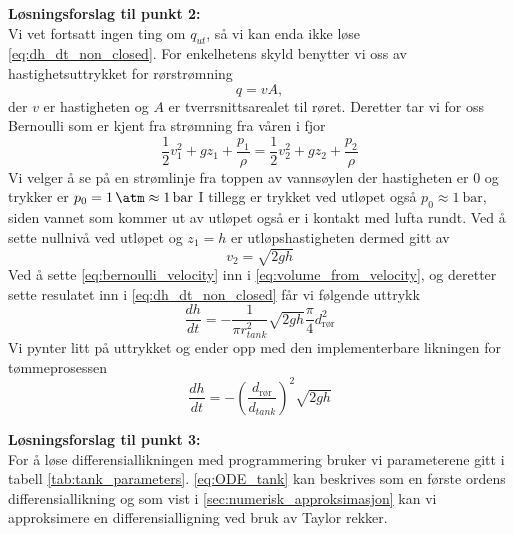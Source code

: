 \textbf{Løsningsforslag til punkt 2:} \\
Vi vet fortsatt ingen ting om $q_{ut}$, så vi kan enda ikke løse \eqref{eq:dh_dt_non_closed}. For enkelhetens skyld benytter vi oss av hastighetsuttrykket for rørstrømning
\begin{equation}
    q = vA,
    \label{eq:volume_from_velocity}
\end{equation}
der $v$ er hastigheten og $A$ er tverrsnittsarealet til røret. Deretter tar vi for oss Bernoulli som er kjent fra strømning fra våren i fjor
\begin{equation}
    \frac{1}{2}v_1^2 + gz_1 + \frac{p_1}{\rho} = \frac{1}{2}v_2^2 + gz_2 + \frac{p_2}{\rho}
\end{equation}
Vi velger å se på en strømlinje fra toppen av vannsøylen der hastigheten er 0 og trykker er $p_0=\SI{1}{\atm}\approx \SI{1}{\bar}$ I tillegg er trykket ved utløpet også $p_0\approx \SI{1}{\bar}$, siden vannet som kommer ut av utløpet også er i kontakt med lufta rundt. Ved å sette nullnivå ved utløpet og $z_1=h$ er utløpshastigheten dermed gitt av 
\begin{equation}
    v_2 = \sqrt{2gh}
    \label{eq:bernoulli_velocity}
\end{equation}
Ved å sette \eqref{eq:bernoulli_velocity} inn i \eqref{eq:volume_from_velocity}, og deretter sette resulatet inn i \eqref{eq:dh_dt_non_closed} får vi følgende uttrykk
\begin{equation}
    \frac{dh}{dt} = -\frac{1}{\pi r_{tank}^2} \sqrt{2gh}\frac{\pi}{4}d_{\text{rør}}^2
\end{equation}
Vi pynter litt på uttrykket og ender opp med den implementerbare likningen for tømmeprosessen
\begin{equation}
    \frac{dh}{dt} = -\left(\frac{d_\text{rør}}{d_{tank}}\right)^2 \sqrt{2gh}
    \label{eq:ODE_tank}
\end{equation}

\textbf{Løsningsforslag til punkt 3:} \\
For å løse differensiallikningen med programmering bruker vi parameterene gitt i tabell \ref{tab:tank_parameters}. \cref{eq:ODE_tank} kan beskrives som en første ordens differensiallikning og som vist i \cref{sec:numerisk_approksimasjon} kan vi approksimere en differensialligning ved bruk av Taylor rekker. 

